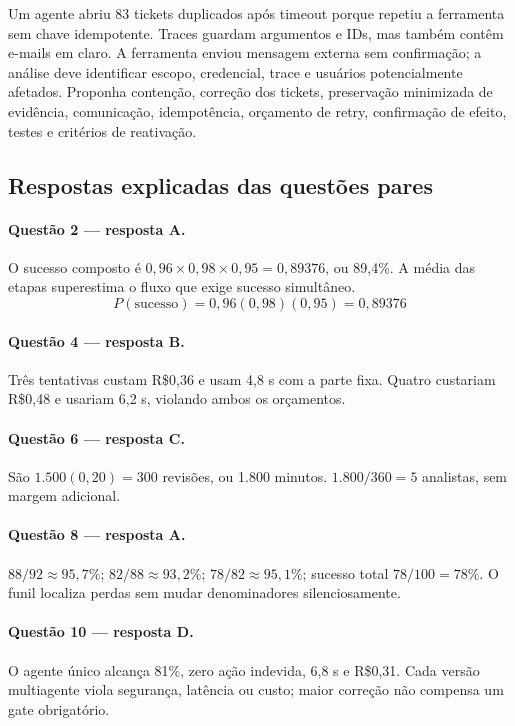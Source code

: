 \TextoBase
Um agente abriu 83 tickets duplicados após timeout porque repetiu a ferramenta sem chave idempotente. Traces guardam argumentos e IDs, mas também contêm e-mails em claro.
A ferramenta enviou mensagem externa sem confirmação; a análise deve identificar escopo, credencial, trace e usuários potencialmente afetados.
\FonteDidatica
\Comando Proponha contenção, correção dos tickets, preservação minimizada de evidência, comunicação, idempotência, orçamento de retry, confirmação de efeito, testes e critérios de reativação.

\newpage
\subsection{Respostas explicadas das questões pares}

\paragraph{Questão 2 — resposta A.} O sucesso composto é $0{,}96\times0{,}98\times0{,}95=0{,}89376$, ou 89,4\%. A média das etapas superestima o fluxo que exige sucesso simultâneo.
\[P(\text{sucesso})=0{,}96(0{,}98)(0{,}95)=0{,}89376\]

\paragraph{Questão 4 — resposta B.} Três tentativas custam R\$0,36 e usam 4,8 s com a parte fixa. Quatro custariam R\$0,48 e usariam 6,2 s, violando ambos os orçamentos.

\paragraph{Questão 6 — resposta C.} São $1.500(0{,}20)=300$ revisões, ou 1.800 minutos. $1.800/360=5$ analistas, sem margem adicional.

\paragraph{Questão 8 — resposta A.} $88/92\approx95{,}7\%$; $82/88\approx93{,}2\%$; $78/82\approx95{,}1\%$; sucesso total $78/100=78\%$. O funil localiza perdas sem mudar denominadores silenciosamente.

\paragraph{Questão 10 — resposta D.} O agente único alcança 81\%, zero ação indevida, 6,8 s e R\$0,31. Cada versão multiagente viola segurança, latência ou custo; maior correção não compensa um gate obrigatório.

